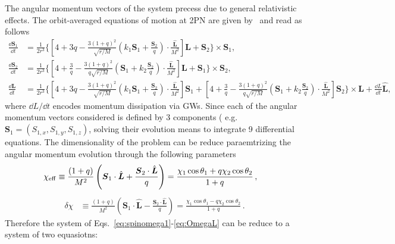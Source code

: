 \documentclass[floats,floatfix,showpacs,amssymb,prd,twocolumn,superscriptaddress,nofootinbib,nolongbibliography,reprint,onecolumn]{revtex4-2}
\renewcommand{\vec}[1]{\mathbf{#1}}
\begin{document}
The angular momentum vectors of the system precess due to general relativistic effects. The orbit-averaged equations of motion at 2PN are given by~\cite{2021arXiv210610291K} and read as follows
\begin{align}
\label{eq:spinomega1}
\frac{\dd \boldsymbol{S}_1}{\dd t} &= \frac{1}{2 r^3} \Bigg\{ \left[ 4+3q  - \frac{3 (1+q)^2}{\sqrt{r /M}}  \left( k_1 \boldsymbol{S}_1+\frac{\boldsymbol{S}_2}{q} \right)\!\cdot\!\frac{\hat{\boldsymbol{L}}}{M^2}\right] \! \boldsymbol{L}+ \boldsymbol{S}_2\Bigg\}  \times \boldsymbol{S}_1,
\\
\label{eq:spinomega2}
\frac{\dd \boldsymbol{S}_2}{\dd t}  &= \frac{1}{2 r^3}\Bigg\{ \left[ 4+\frac{3}{q}  - \frac{3 (1+q)^2}{q\sqrt{r / M}}  \left( \boldsymbol{S}_1+ k_2 \frac{\boldsymbol{S}_2}{q} \right) \!\cdot\! \frac{\hat{\boldsymbol{L}}}{M^2}  \right]\! \boldsymbol{L} + \boldsymbol{S}_1\Bigg\} \times \boldsymbol{S}_2,\\
\label{eq:OmegaL}
\frac{\dd \boldsymbol{L}}{\dd t} &= \frac{1}{2 r^3 }\Bigg\{  \left[ 4+3q  - \frac{3 (1+q)^2}{\sqrt{r /M}}  \left( k_1 \boldsymbol{S}_1+\frac{\boldsymbol{S}_2}{q} \right) \!\cdot\! \frac{\hat{\boldsymbol{L}}}{M^2}\right] \! \boldsymbol{S}_1+ \left[ 4+\frac{3}{q}   - \frac{3 (1+q)^2}{q\sqrt{r / M}}  \left( \boldsymbol{S}_1+ k_2 \frac{\boldsymbol{S}_2}{q} \right) \!\cdot\! \frac{\hat{\boldsymbol{L}}}{M^2} \right] \! \boldsymbol{S}_2\Bigg\} \times \boldsymbol{L} +\frac{\dd L}{\dd t}\hat{\boldsymbol{L}},
\end{align}
where ${\dd L}/{\dd t}$ encodes momentum dissipation via GWs.
Since each of the angular momentum vectors considered is defined by 3 components ( e.g. $\vec{S}_1=(S_{1,x}, S_{1,y}, S_{1,z} )$, solving their evolution means to integrate 9 differential equations. The dimensionality of the problem can be reduce paraemtrizing the angular momentum evolution through the following parameters
\begin{align}
\chi_{\rm eff} &\equiv\frac{(1+q)}{M^2}  \left(  \boldsymbol{S}_1  \cdot \hat{\boldsymbol{L}} +\frac{\boldsymbol{S}_2  \cdot \hat{\boldsymbol{L}} }{q} \right)=  \frac{\chi_1 \cos\theta_1 + q \chi_2\cos\theta_2}{1+q}\,,
\end{align}
\begin{align}
\delta \chi &\equiv \frac{(1+q)}{M^2}  \left(  \boldsymbol{S}_1  \cdot \hat{\boldsymbol{L}} -\frac{\boldsymbol{S}_2  \cdot \hat{\boldsymbol{L}} }{q} \right)=  \frac{\chi_1 \cos\theta_1 - q \chi_2\cos\theta_2}{1+q}\,.
\end{align}
Therefore the system of Eqs.~\eqref{eq:spinomega1}-\eqref{eq:OmegaL} can be reduce to a system of two equasiotns: 
\end{document}
